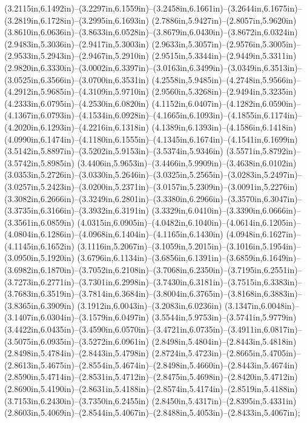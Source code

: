 (3.2115in,6.1492in)--(3.2297in,6.1559in)--(3.2458in,6.1661in)--(3.2644in,6.1675in)--(3.2819in,6.1728in)--(3.2995in,6.1693in) (2.7886in,5.9427in)--(2.8057in,5.9620in) (3.8610in,6.0636in)--(3.8633in,6.0528in)--(3.8679in,6.0430in)--(3.8672in,6.0324in) (2.9483in,5.3036in)--(2.9417in,5.3003in) (2.9633in,5.3057in)--(2.9576in,5.3005in)--(2.9533in,5.2943in)--(2.9467in,5.2910in) (2.9515in,5.3344in)--(2.9449in,5.3311in) (2.9820in,6.3330in)--(3.0002in,6.3397in)--(3.0163in,6.3499in)--(3.0349in,6.3513in)--(3.0525in,6.3566in)--(3.0700in,6.3531in) (4.2558in,5.9485in)--(4.2748in,5.9566in)--(4.2912in,5.9685in)--(4.3109in,5.9710in) (2.9560in,5.3268in)--(2.9494in,5.3235in) (4.2333in,6.0795in)--(4.2530in,6.0820in) (4.1152in,6.0407in)--(4.1282in,6.0590in)--(4.1367in,6.0793in)--(4.1534in,6.0928in)--(4.1665in,6.1093in)--(4.1855in,6.1174in)--(4.2020in,6.1293in)--(4.2216in,6.1318in) (4.1389in,6.1393in)--(4.1586in,6.1418in) (4.0990in,6.1474in)--(4.1180in,6.1555in)--(4.1345in,6.1674in)--(4.1541in,6.1699in) (3.5142in,5.8897in)--(3.5202in,5.9153in)--(3.5374in,5.9346in) (3.5571in,5.8792in)--(3.5742in,5.8985in) (3.4406in,5.9653in)--(3.4466in,5.9909in)--(3.4638in,6.0102in) (3.0353in,5.2726in)--(3.0330in,5.2646in)--(3.0325in,5.2565in)--(3.0283in,5.2497in)--(3.0257in,5.2423in)--(3.0200in,5.2371in)--(3.0157in,5.2309in)--(3.0091in,5.2276in) (3.3082in,6.2666in)--(3.3249in,6.2801in)--(3.3380in,6.2966in)--(3.3570in,6.3047in)--(3.3735in,6.3166in)--(3.3932in,6.3191in) (3.3329in,6.0410in)--(3.3390in,6.0666in)--(3.3561in,6.0859in) (4.0315in,6.0905in)--(4.0482in,6.1040in)--(4.0614in,6.1205in)--(4.0804in,6.1286in)--(4.0968in,6.1404in)--(4.1165in,6.1430in) (4.0948in,6.1627in)--(4.1145in,6.1652in) (3.1116in,5.2067in)--(3.1059in,5.2015in)--(3.1016in,5.1954in)--(3.0950in,5.1920in) (3.6796in,6.1134in)--(3.6856in,6.1391in)--(3.6859in,6.1649in)--(3.6982in,6.1870in)--(3.7052in,6.2108in)--(3.7068in,6.2350in)--(3.7195in,6.2551in)--(3.7273in,6.2771in)--(3.7301in,6.2998in)--(3.7430in,6.3181in)--(3.7515in,6.3383in)--(3.7683in,6.3519in)--(3.7814in,6.3684in)--(3.8004in,6.3765in)--(3.8168in,6.3883in)--(3.8365in,6.3909in) (3.1912in,6.0043in)--(3.2083in,6.0236in) (3.1347in,6.0048in)--(3.1407in,6.0304in)--(3.1579in,6.0497in) (3.5544in,5.9753in)--(3.5741in,5.9779in) (3.4422in,6.0435in)--(3.4590in,6.0570in)--(3.4721in,6.0735in)--(3.4911in,6.0817in)--(3.5075in,6.0935in)--(3.5272in,6.0961in) (2.8498in,5.4804in)--(2.8443in,5.4818in) (2.8498in,5.4784in)--(2.8443in,5.4798in) (2.8724in,5.4723in)--(2.8665in,5.4705in)--(2.8613in,5.4675in)--(2.8554in,5.4674in)--(2.8498in,5.4660in)--(2.8443in,5.4674in) (2.8590in,5.4714in)--(2.8531in,5.4712in)--(2.8475in,5.4698in)--(2.8420in,5.4712in) (2.8690in,5.4190in)--(2.8631in,5.4188in)--(2.8574in,5.4174in)--(2.8519in,5.4188in) (3.7153in,6.2430in)--(3.7350in,6.2455in) (2.8450in,5.4317in)--(2.8395in,5.4331in) (2.8603in,5.4069in)--(2.8544in,5.4067in)--(2.8488in,5.4053in)--(2.8433in,5.4067in);
